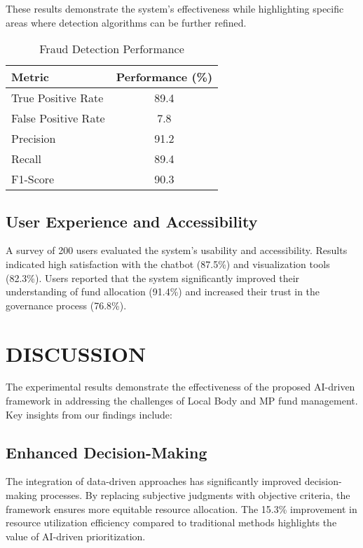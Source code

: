 \documentclass[12pt,a4paper]{report}
\begin{document}
\noindent These results demonstrate the system's effectiveness while highlighting specific areas where detection algorithms can be further refined.

\begin{table}[h]
\centering
\caption{Fraud Detection Performance}
\label{tab:fraud_detection}
\begin{tabular}{lc}
\toprule
\textbf{Metric} & \textbf{Performance (\%)} \\
\midrule
True Positive Rate & 89.4 \\
False Positive Rate & 7.8 \\
Precision & 91.2 \\
Recall & 89.4 \\
F1-Score & 90.3 \\
\bottomrule
\end{tabular}
\end{table}

\section{User Experience and Accessibility}
\indent \indent A survey of 200 users evaluated the system's usability and accessibility. Results indicated high satisfaction with the chatbot (87.5\%) and visualization tools (82.3\%). Users reported that the system significantly improved their understanding of fund allocation (91.4\%) and increased their trust in the governance process (76.8\%).

\chapter{DISCUSSION}
\indent \indent The experimental results demonstrate the effectiveness of the proposed AI-driven framework in addressing the challenges of Local Body and MP fund management. Key insights from our findings include:

\section{Enhanced Decision-Making}
\indent \indent The integration of data-driven approaches has significantly improved decision-making processes. By replacing subjective judgments with objective criteria, the framework ensures more equitable resource allocation. The 15.3\% improvement in resource utilization efficiency compared to traditional methods highlights the value of AI-driven prioritization.
\end{document}
